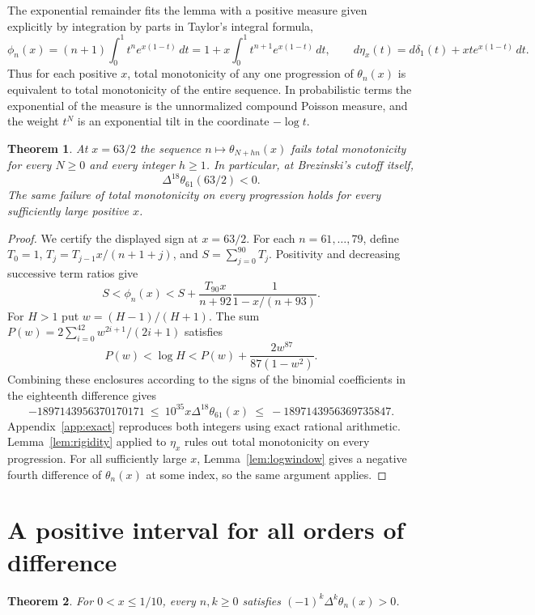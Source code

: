 \documentclass[11pt,a4paper]{article}
\newtheorem{theorem}{Theorem}[section]
\begin{document}
The exponential remainder fits the lemma with a positive measure
given explicitly by integration by parts in Taylor's integral formula,
\[
 \phi_n(x)=(n+1)\int_0^1 t^n e^{x(1-t)}\,dt
 =1+x\int_0^1 t^{n+1}e^{x(1-t)}\,dt,\qquad
 d\eta_x(t)=d\delta_1(t)+xt e^{x(1-t)}\,dt.
\]
Thus for each positive $x$, total monotonicity of any one progression
of $\theta_n(x)$ is equivalent to total monotonicity of the entire
sequence. In probabilistic terms the exponential of the measure is
the unnormalized compound Poisson measure, and the weight $t^N$
is an exponential tilt in the coordinate $-\log t$.

\begin{theorem}\label{thm:brezinski}
At $x=63/2$ the sequence $n\mapsto\theta_{N+hn}(x)$ fails total
monotonicity for every $N\ge0$ and every integer $h\ge1$.
In particular, at Brezinski's cutoff itself,
\[
  \Delta^{18}\theta_{61}(63/2)<0 .
\]
The same failure of total monotonicity on every progression holds
for every sufficiently large positive $x$.
\end{theorem}

\begin{proof}
We certify the displayed sign at $x=63/2$. For each
$n=61,\ldots,79$, define $T_0=1$,
$T_j=T_{j-1}x/(n+1+j)$, and $S=\sum_{j=0}^{90}T_j$. Positivity
and decreasing successive term ratios give
\[
 S<\phi_n(x)<
 S+\frac{T_{90}x}{n+92}\frac{1}{1-x/(n+93)} .
\]
For $H>1$ put $w=(H-1)/(H+1)$. The sum
$P(w)=2\sum_{i=0}^{42}w^{2i+1}/(2i+1)$ satisfies
\[
 P(w)<\log H<P(w)+\frac{2w^{87}}{87(1-w^2)} .
\]
Combining these enclosures according to the signs of the binomial
coefficients in the eighteenth difference gives
\[
 -1897143956370170171\ \le\ 
 10^{35}x\Delta^{18}\theta_{61}(x)
 \ \le\ -1897143956369735847 .
\]
Appendix~\ref{app:exact} reproduces both integers using exact rational arithmetic.
Lemma~\ref{lem:rigidity} applied to $\eta_x$ rules out total monotonicity
on every progression. For all sufficiently large $x$,
Lemma~\ref{lem:logwindow} gives a negative fourth difference of
$\theta_n(x)$ at some index, so the same argument applies.
\end{proof}


\section{A positive interval for all orders of difference}
\label{sec:smallx}

\begin{theorem}\label{thm:small}
For $0<x\le 1/10$, every $n,k\ge0$ satisfies
$(-1)^k\Delta^k\theta_n(x)>0$.
\end{theorem}
\end{document}

